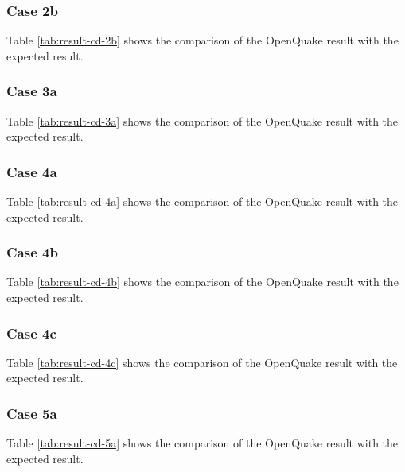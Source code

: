 \subsubsection{Case 2b}




Table \ref{tab:result-cd-2b} shows the comparison of the OpenQuake result with the expected result.

\subsubsection{Case 3a}




Table \ref{tab:result-cd-3a} shows the comparison of the OpenQuake result with the expected result.

\subsubsection{Case 4a}




Table \ref{tab:result-cd-4a} shows the comparison of the OpenQuake result with the expected result.

\subsubsection{Case 4b}




Table \ref{tab:result-cd-4b} shows the comparison of the OpenQuake result with the expected result.

\subsubsection{Case 4c}




Table \ref{tab:result-cd-4c} shows the comparison of the OpenQuake result with the expected result.

\subsubsection{Case 5a}




Table \ref{tab:result-cd-5a} shows the comparison of the OpenQuake result with the expected result.
